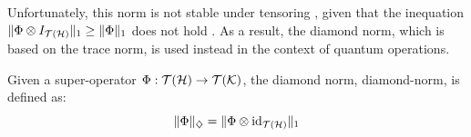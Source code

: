 

Unfortunately, this norm is not stable under tensoring , given that the inequation $ \lVert \Phi \otimes I_{\mathcal{T}(\mathcal{H})} \rVert_{1} \geq \lVert \Phi \rVert_{1}$ does not hold \cite{watrous2018theory}. As a result, the diamond norm, which is based on the trace norm, is used instead in the context of quantum operations. 
\begin{definition} \label{def:diamond_norm}
  Given a super-operator $\Phi: \mathcal{T}(\mathcal{H}) \to \mathcal{T}(\mathcal{K})$, the diamond norm, \gls{diamond-norm}, is defined as:
  \begin{equation*}  \label{eq:diamond_distance}
    \lVert \Phi \rVert_{\diamondsuit} =  \lVert \Phi \otimes \mathrm{id}_{\mathcal{T}(\mathcal{H})} \rVert_{1}
  \end{equation*}
\end{definition}




